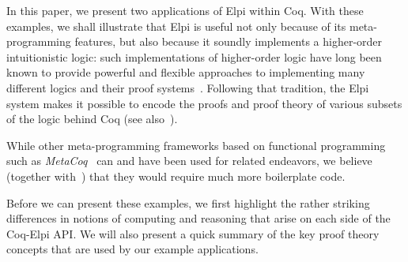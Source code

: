 In this paper, we present two applications of Elpi within Coq. With
these examples, we shall illustrate that Elpi is useful not only
because of its meta-programming features, but also because it soundly
implements a higher-order intuitionistic logic: such implementations
of higher-order logic have long been known to provide powerful and
flexible approaches to implementing many different logics and their
proof systems~\cite{felty89phd,felty88cade,paulson89jar}.  Following
that tradition, the Elpi system makes it possible to encode the proofs
and proof theory of various subsets of the logic behind Coq (see also~\cite{felty93lics}). 

While other meta-programming frameworks based on functional
programming such as \emph{MetaCoq}~\cite{sozeau2020metacoq} can and
have been used for related endeavors, we believe (together
with~\cite{DunchevCT16}) that they would require much more
boilerplate code.

Before we can present these examples, we first highlight the rather
striking differences in notions of computing and reasoning that arise
on each side of the Coq-Elpi API.   We will also present a quick
summary of the key proof theory concepts that are used by our example
applications.


